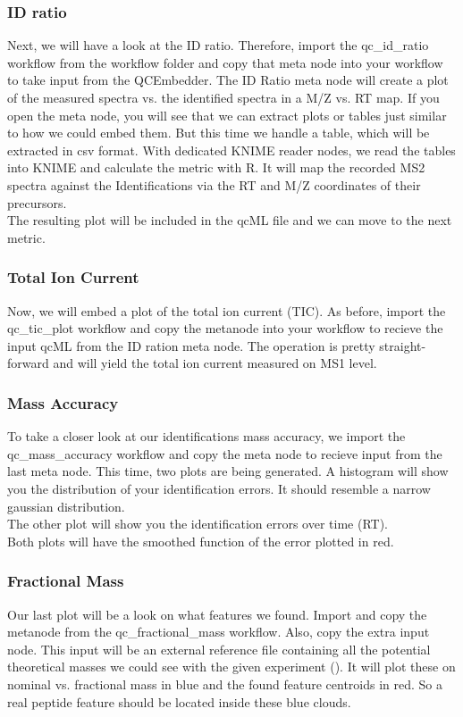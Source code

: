 \subsubsection{ID ratio}
Next, we will have a look at the ID ratio. Therefore, import the qc\_id\_ratio workflow from the workflow folder and copy that meta node into your workflow to take input from the QCEmbedder. The ID Ratio meta node will create a plot of the measured spectra vs. the identified spectra in a M/Z vs. RT map. If you open the meta node, you will see that we can extract plots or tables just similar to how we could embed them. But this time we handle a table, which will be extracted in csv format. With dedicated KNIME reader nodes, we read the tables into KNIME and calculate the metric with R. It will map the recorded MS2 spectra against the Identifications via the RT and M/Z coordinates of their precursors.\\
The resulting plot will be included in the qcML file and we can move to the next metric.

\subsubsection{Total Ion Current}
Now, we will embed a plot of the total ion current (TIC). As before, import the qc\_tic\_plot workflow and copy the metanode into your workflow to recieve the input qcML from the ID ration meta node. The operation is pretty straight-forward and will yield the total ion current measured on MS1 level.

\subsubsection{Mass Accuracy}
To take a closer look at our identifications mass accuracy, we import the qc\_mass\_accuracy workflow and copy the meta node to recieve input from the last meta node. This time, two plots are being generated. A histogram will show you the distribution of your identification errors. It should resemble a narrow gaussian distribution. \\ 
The other plot will show you the identification errors over time (RT). \\
Both plots will have the smoothed function of the error plotted in red.

\subsubsection{Fractional Mass}
Our last plot will be a look on what features we found. Import and copy the metanode from the qc\_fractional\_mass workflow. Also, copy the extra input node. This input will be an external reference file containing all the potential theoretical masses we could see with the given experiment (). It will plot these on nominal vs. fractional mass in blue and the found feature centroids in red. So a real peptide feature should be located inside these blue clouds.

